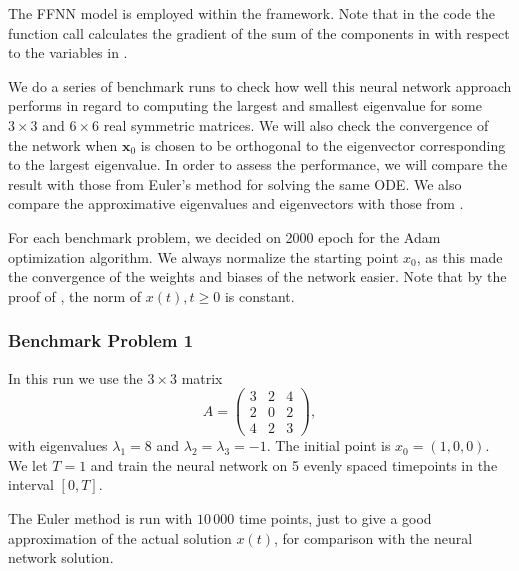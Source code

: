 The FFNN model is employed within the  framework. Note that in the code the function call  calculates the gradient of the sum of the components in  with respect to the variables in .

We do a series of benchmark runs to check how well this neural network approach performs in regard to computing the largest and smallest eigenvalue for some $3\times 3$ and $6\times 6$ real symmetric matrices. We will also check the convergence of the network when $\mathbf{x}_0$ is chosen to be orthogonal to the eigenvector corresponding to the largest eigenvalue. In order to assess the performance, we will compare the result with those from Euler's method for solving the same ODE. We also compare the approximative eigenvalues and eigenvectors with those from .

For each benchmark problem, we decided on 2000 epoch for the Adam optimization algorithm. We always normalize the starting point $x_0$, as this made the convergence of the weights and biases of the network easier. Note that by the proof of \cite[Theorem 2]{yfh04}, the norm of $x(t),t\ge0$ is constant.

\subsubsection{Benchmark Problem 1}\label{sec:benchmark problem 1}
In this run we use the $3\times 3$ matrix
\begin{equation}\label{eq:33mat}
    A = \left(\begin{array}{ccc}
        3 & 2 & 4  \\
        2 & 0 & 2  \\
        4 & 2 & 3
    \end{array}\right),
\end{equation}
with eigenvalues $\lambda_1 = 8$ and $\lambda_2 = \lambda_3 = -1$. The initial point is $x_0=(1,0,0)$. We let $T=1$ and train the neural network on 5 evenly spaced timepoints in the interval $[0,T]$.

The Euler method is run with $10\,000$ time points, just to give a good approximation of the actual solution $x(t)$, for comparison with the neural network solution.

